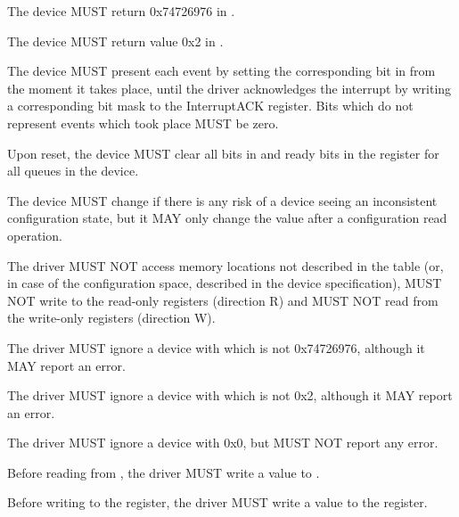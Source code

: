 
The device MUST return 0x74726976 in .

The device MUST return value 0x2 in .

The device MUST present each event by setting the corresponding bit in  from the
moment it takes place, until the driver acknowledges the interrupt
by writing a corresponding bit mask to the InterruptACK register.  Bits which
do not represent events which took place MUST be zero.

Upon reset, the device MUST clear all bits in  and ready bits in the
 register for all queues in the device.

The device MUST change  if there is any risk of a
device seeing an inconsistent configuration state, but it MAY only change the value
after a configuration read operation.

The driver MUST NOT access memory locations not described in the
table (or, in case of the configuration space, described in the device specification),
MUST NOT write to the read-only registers (direction R) and
MUST NOT read from the write-only registers (direction W).

The driver MUST ignore a device with  which is not 0x74726976,
although it MAY report an error.

The driver MUST ignore a device with  which is not 0x2,
although it MAY report an error.

The driver MUST ignore a device with  0x0,
but MUST NOT report any error.

Before reading from , the driver MUST write a value to .

Before writing to the  register, the driver MUST write a value to the  register.

